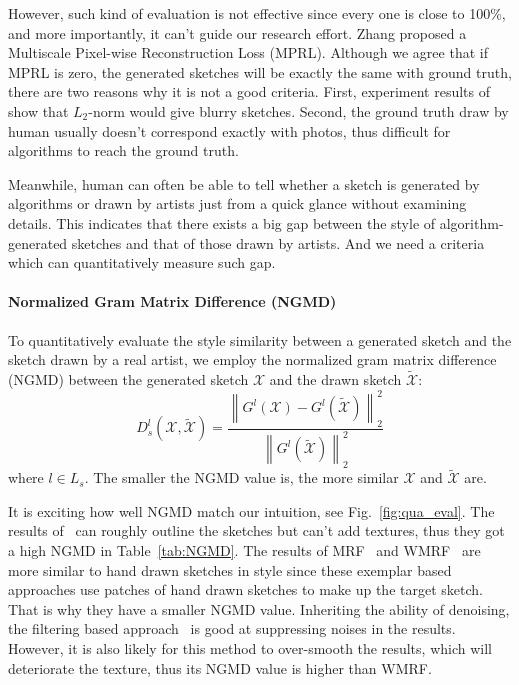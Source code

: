 \documentclass[10pt,twocolumn,letterpaper]{article}
\begin{document}
However, such kind of evaluation is not effective since every one is close to 100\%, and more importantly, it can't guide our research effort. Zhang \etal \cite{zhang2015end} proposed a  Multiscale Pixel-wise Reconstruction Loss (MPRL). Although we agree that if MPRL is zero, the generated sketches will be exactly the same with ground truth, there are two reasons why it is not a good criteria. First, experiment results of \cite{zhang2015end, zhang2017content} show that $L_2$-norm would give blurry sketches. Second, the ground truth draw by human usually doesn't correspond exactly with photos, thus difficult for algorithms to reach the ground truth.

Meanwhile, human can often be able to tell whether a sketch is generated by algorithms or drawn by artists just from a quick glance without examining details.
This indicates that there exists a big gap between the style of algorithm-generated sketches and that of those drawn by artists. And we need a criteria which can quantitatively measure such gap.

\paragraph*{Normalized Gram Matrix Difference (NGMD)} To quantitatively evaluate the style similarity between a generated sketch and the sketch drawn by a real artist, we employ the normalized gram matrix difference (NGMD) between the generated sketch $\mathcal{X}$ and the drawn sketch ${\tilde {\mathcal{X}}}$:
\begin{equation}
{D^l_s}\left( {\mathcal{X},\tilde {\mathcal{X}}} \right) = \frac{{\left\| {{G^l}\left( \mathcal{X} \right) - {G^l}\left( {\tilde {\mathcal{X}}} \right)} \right\|_2^2}}{{\left\| {{G^l}\left( {\tilde {\mathcal{X}}} \right)} \right\|_2^2}}
\label{eq:style_exp}
\end{equation}
where $l\in L_s$. The smaller the NGMD value is, the more similar $\mathcal{X}$ and ${\tilde {\mathcal{X}}}$ are. 

It is exciting how well NGMD match our intuition, see Fig.~\ref{fig:qua_eval}. 
The results of~\cite{zhang2015end} can roughly outline the sketches but can't add textures, thus they got a high NGMD in Table~\ref{tab:NGMD}. The results of MRF~\cite{wang2009face} and WMRF~\cite{zhou2012markov} are more similar to hand drawn sketches in style since these exemplar based approaches use patches of hand drawn sketches to make up the target sketch. That is why they have a smaller NGMD value. Inheriting the ability of denoising, the filtering based approach~\cite{song2014real} is good at suppressing noises in the results. However, it is also likely for this method to over-smooth the results, which will deteriorate the texture, thus its NGMD value is higher than WMRF. 
\end{document}
